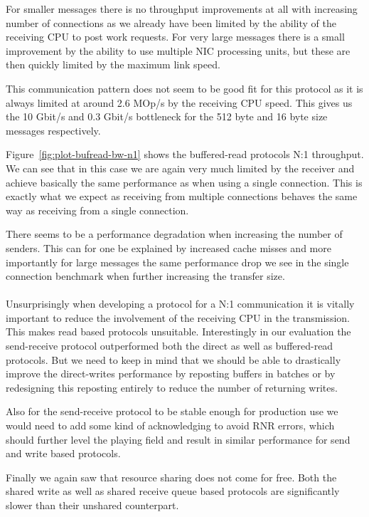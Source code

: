 For smaller messages there is no throughput improvements at all with increasing number of connections as we already have 
been limited by the ability of the receiving CPU to post work requests. For very large messages there is a small improvement 
by the ability to use multiple NIC processing units, but these are then quickly limited by the maximum link speed.

This communication pattern does not seem to be good fit for this protocol as it is always limited at around 
2.6 MOp/s by the receiving CPU speed. This gives us the 10 Gbit/s and 0.3 Gbit/s bottleneck for the 512 byte and 16 byte size
messages respectively.

Figure~\ref{fig:plot-bufread-bw-n1} shows the buffered-read protocols N:1 throughput.  We can see that in this case we are 
again very much limited by the receiver and achieve basically the same performance as when using a single connection. This is 
exactly what we expect as receiving from multiple connections behaves the same way as receiving from a single connection.

There seems to be a performance degradation when increasing the number of senders. This can for one be explained
by increased cache misses and more importantly for large messages the same performance drop we see in the single connection 
benchmark when further increasing the transfer size.


\paragraph{} Unsurprisingly when developing a protocol for a N:1 communication it is vitally important to reduce the 
involvement of the receiving CPU in the transmission. This makes read based protocols unsuitable. Interestingly in our
evaluation the send-receive protocol outperformed both the direct as well as buffered-read protocols. But we need to 
keep in mind that we should be able to drastically improve the direct-writes performance by reposting buffers in batches or 
by redesigning this reposting entirely to reduce the number of returning writes.

Also for the send-receive protocol to be stable enough for production use we would need to add some kind of acknowledging to
avoid RNR errors, which should further level the playing field and result in similar performance for send and write based 
protocols.

Finally we again saw that resource sharing does not come for free. Both the shared write as well as shared receive queue based
protocols are significantly slower than their unshared counterpart. 








